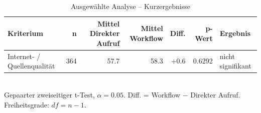 \begin{table}[htbp]
\centering
\caption{Ausgewählte Analyse -- Kurzergebnisse}
\begin{tabular}{lrrrrrl}
\toprule
Kriterium & n & Mittel Direkter Aufruf & Mittel Workflow & Diff. & p-Wert & Ergebnis \\
\midrule
Internet- / Quellenqualität & 364 & 57.7 & 58.3 & +0.6 & 0.6292 & nicht signifikant \\
\bottomrule
\end{tabular}
\\[2mm]
\footnotesize Gepaarter zweiseitiger t-Test, $\alpha=0.05$. Diff. = Workflow $-$ Direkter Aufruf. Freiheitsgrade: $df=n-1$.
\end{table}
